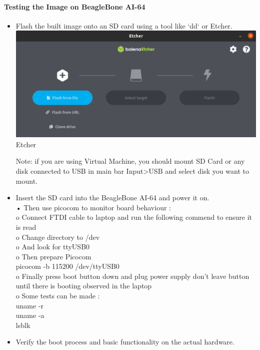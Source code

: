 \paragraph{Testing the Image on BeagleBone AI-64}
\begin{itemize}
    \item Flash the built image onto an SD card using a tool like `dd` or Etcher.\\
    
       
        \includegraphics[width=1\linewidth]{Images/9_Linux_image/Etcher.png}
 \centering        
Etcher
        \label{fig:enter-label} 
\\
\raggedright 
    
    Note: if you are using Virtual Machine, you should mount SD Card or any disk connected to USB in main bar Input>USB and select disk you want to mount.
    \item Insert the SD card into the BeagleBone AI-64 and power it on. \\
    •	Then use picocom to monitor board behaviour : \\
        o	Connect FTDI cable to laptop and run the following commend to ensure it is read\\
        o	Change directory to /dev \\
        o	And look for ttyUSB0 \\
        o	Then prepare Picocom \\
        picocom -b 115200 /dev/ttyUSB0 \\
        o	Finally press boot button down and plug power supply don’t leave button until there is booting observed in the laptop \\
        o	Some tests can be made : \\
        uname -r \\
        uname -a \\
        lsblk \\

    \item Verify the boot process and basic functionality on the actual hardware.
\end{itemize}

